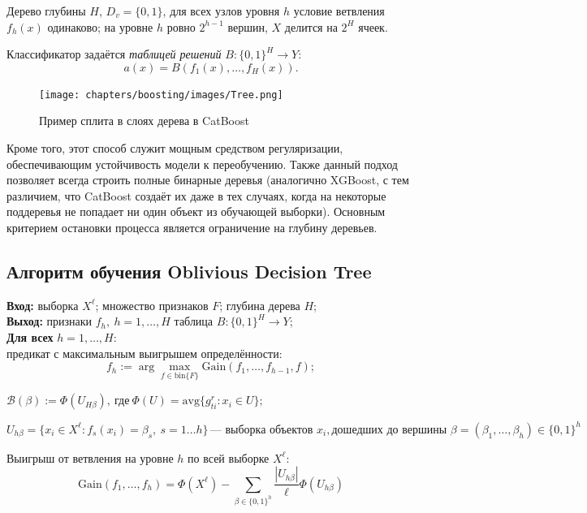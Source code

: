 Дерево глубины $H$, $D_v = \{0, 1\}$, для всех узлов уровня $h$ условие ветвления $f_h(x)$ одинаково; на уровне $h$ ровно $2^{h-1}$ вершин, $X$ делится на $2^H$ ячеек.

Классификатор задаётся \textit{таблицей решений} $B: \{0,1\}^H \to Y$:
$$
a(x) = B(f_1(x), \ldots, f_H(x)).
$$

\begin{figure}[ht]
    \centering
    \texttt{[image: chapters/boosting/images/Tree.png]}
    \caption{Пример сплита в слоях дерева в CatBoost}
\end{figure}

Кроме того, этот способ служит мощным средством регуляризации, обеспечивающим устойчивость модели к переобучению. Также данный подход позволяет всегда строить полные бинарные деревья (аналогично XGBoost, с тем различием, что CatBoost создаёт их даже в тех случаях, когда на некоторые поддеревья не попадает ни один объект из обучающей выборки). Основным критерием остановки процесса является ограничение на глубину деревьев.

\subsection*{Алгоритм обучения Oblivious Decision Tree}

\begin{tcolorbox}[colback=black!10, colframe=black]
\textbf{Вход:} выборка $X^\ell$; множество признаков $F$; глубина дерева $H$;\\
\textbf{Выход:} признаки $f_h, \ h = 1, \ldots, H$  таблица $B: \{0,1\}^H \to Y$;\\
\textbf{Для всех} $h = 1, \ldots, H$:\\
предикат с максимальным выигрышем определённости:
$$
f_h := \arg\max_{f \in \mathrm{bin}\{F\}} \text{Gain}(f_1, \ldots, f_{h-1}, f);
$$

\(\mathcal{B}(\beta) := \Phi(U_{H\beta}), \ \text{где} \ \Phi(U) = \text{avg}\{g_{ti}^r : x_i \in U\};\)
\end{tcolorbox}

$$
U_{h\beta} = \{x_i \in X^\ell : f_s(x_i) = \beta_s, \ s = 1 \ldots h\} \, \text{— выборка объектов } x_i,
\text{дошедших до вершины } \beta = (\beta_1, \ldots, \beta_h) \in \{0,1\}^h
$$

Выигрыш от ветвления на уровне \(h\) по всей выборке \(X^\ell\):
$$
\text{Gain}(f_1, \ldots, f_h) = \Phi(X^\ell) - \sum_{\beta \in \{0,1\}^h} \frac{|U_{h\beta}|}{\ell} \Phi(U_{h\beta})
$$

